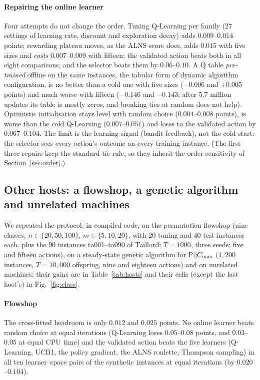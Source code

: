 

\paragraph{Repairing the online learner}\label{sec:repairs} Four attempts do not change the order. Tuning Q-Learning per family ($27$ settings of learning rate, discount and exploration decay) adds $0.009$--$0.014$ points; rewarding plateau moves, as the ALNS score does, adds $0.015$ with five sizes and \emph{costs} $0.007$--$0.009$ with fifteen; the validated action beats both in all eight comparisons, and the selector beats them by $0.06$--$0.10$. A Q table \emph{pre-trained} offline on the same instances, the tabular form of dynamic algorithm configuration, is no better than a cold one with five sizes ($-0.006$ and $+0.005$ points) and much worse with fifteen ($-0.146$ and $-0.143$; after $5.7$ million updates its table is mostly zeros, and breaking ties at random does not help). Optimistic initialisation stays level with random choice ($0.004$--$0.008$ points), is worse than the cold Q-Learning ($0.007$--$0.051$) and loses to the validated action by $0.067$--$0.104$. The limit is the learning signal (bandit feedback), not the cold start: the selector sees every action's outcome on every training instance. (The first three repairs keep the standard tie rule, so they inherit the order sensitivity of Section~\ref{sec:order}.)

\subsection{Other hosts: a flowshop, a genetic algorithm and unrelated machines}
\label{sec:hosts}
We repeated the protocol, in compiled code, on the permutation flowshop (nine classes, $n\in\{20,50,100\}$, $m\in\{5,10,20\}$, with $20$ tuning and $40$ test instances each, plus the $90$ instances ta001--ta090 of Taillard; $T=1000$, three seeds; five and fifteen actions), on a steady-state genetic algorithm for P$||C_{\max}$ ($1{,}200$ instances, $T=10{,}000$ offspring, nine and eighteen actions) and on unrelated machines; their gains are in Table~\ref{tab:hosts} and their cells (except the last host's) in Fig.~\ref{fig:class}.

\paragraph{Flowshop} The cross-fitted headroom is only $0.012$ and $0.025$ points. No online learner beats random choice at equal iterations (Q-Learning loses $0.05$--$0.08$ points, and $0.03$--$0.05$ at equal CPU time) and the validated action beats the five learners (Q-Learning, UCB1, the policy gradient, the ALNS roulette, Thompson sampling) in all ten learner--space pairs of the synthetic instances at equal iterations (by $0.020$--$0.104$).

